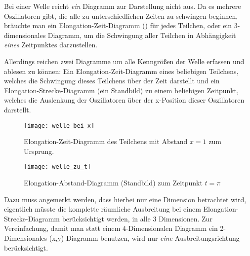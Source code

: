 Bei einer Welle reicht \emph{ein} Diagramm zur Darstellung nicht aus. Da es mehrere Oszillatoren gibt, die alle zu unterschiedlichen Zeiten zu schwingen beginnen, bräuchte man ein Elongation-Zeit-Diagramm () für jedes Teilchen, oder ein 3-dimensionales Diagramm, um die Schwingung aller Teilchen in Abhängigkeit \emph{eines} Zeitpunktes darzustellen.

Allerdings reichen zwei Diagramme um alle Kenngrößen der Welle erfassen und ablesen zu können: Ein Elongation-Zeit-Diagramm eines beliebigen Teilchens, welches die Schwingung dieses Teilchens über der Zeit darstellt und ein Elongation-Strecke-Diagramm (ein \glqq Standbild\grqq) zu einem beliebigen Zeitpunkt, welches die Auslenkung der Oszillatoren über der x-Position dieser Oszillatoren darstellt.

\begin{figure}[h!]
	\centering
	\texttt{[image: welle\_bei\_x]}
	\begin{comment} 'plot_pitics.p'
set dummy t
set ylabel "y"
set xlabel "t"
unset key
set output 'welle_bei_x.png'
plot sin(2*pi*((t/(2*pi))-(1/pi))) ls 1
	\end{comment}
	\caption{Elongation-Zeit-Diagramm des Teilchens mit Abstand $x=1$ zum Ursprung.}
	\label{fig:welle_bei_x}
\end{figure}
\begin{figure}[h!]
	\centering
	\texttt{[image: welle\_zu\_t]}
	\begin{comment} 'plot_pitics.p'
set dummy x
set ylabel "y"
set xlabel "x"
unset xtics
set xtics axis
set xtics ('1' 1, '2' 2, '3' 3, '4' 4, '5' 5, '6' 6, '7' 7)
set xzeroaxis ls 2
unset key
set output 'welle_zu_t.png'
plot sin(2*pi*((pi/(2*pi))-(x/pi))) ls 1
	\end{comment}
	\caption{Elongation-Abstand-Diagramm (\glqq Standbild\grqq ) zum Zeitpunkt $t=\pi$}
	\label{fig:welle_zu_t}
\end{figure}

Dazu muss angemerkt werden, dass hierbei nur eine Dimension betrachtet wird, eigentlich müsste die komplette räumliche Ausbreitung bei einem Elongation-Strecke-Diagramm berücksichtigt werden, in alle 3 Dimensionen. Zur Vereinfachung, damit man statt einem 4-Dimensionalen Diagramm ein 2-Dimensionales (x,y) Diagramm benutzen, wird nur \emph{eine} Ausbreitungsrichtung berücksichtigt.
